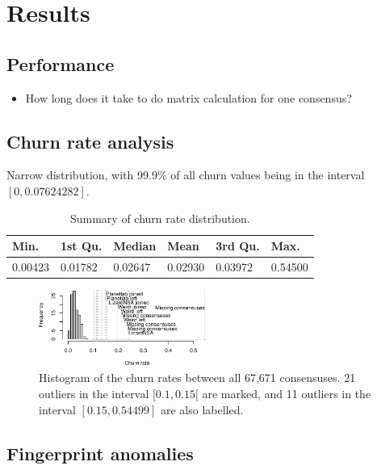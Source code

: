 \section{Results}
\label{sec:results}

\subsection{Performance}

\begin{itemize}
	\item How long does it take to do matrix calculation for one consensus?
\end{itemize}

\subsection{Churn rate analysis}
Narrow distribution, with 99.9\% of all churn values being in the interval $[0, 0.07624282]$.

\begin{table}[ht]
	\centering
	\begin{tabular}{llllll}
	Min. & 1st Qu. & Median & Mean & 3rd Qu. & Max. \\
	\hline
	0.00423 & 0.01782 & 0.02647 & 0.02930 & 0.03972 & 0.54500 \\
	\end{tabular}
	\caption{Summary of churn rate distribution.}
	\label{tab:churn_distribution}
\end{table}

\begin{figure}[t]
	\centering
	\includegraphics[width=0.49\textwidth]{diagrams/churn.pdf}
	\caption{Histogram of the churn rates between all 67,671 consensuses.  21
		outliers in the interval $[0.1, 0.15[$ are marked, and 11 outliers in
		the interval $[0.15, 0.54499]$ are also labelled.}
	\label{fig:churn}
\end{figure}

\subsection{Fingerprint anomalies}

